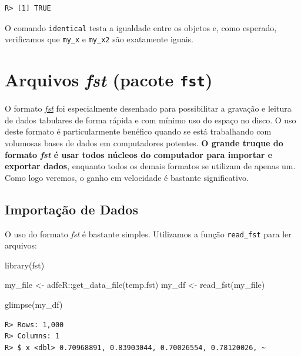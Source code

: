 \documentclass[
  11pt,
]{book}
\newenvironment{Shaded}{\begin{snugshade}}{\end{snugshade}}
\newcommand{\FunctionTok}[1]{\textcolor[rgb]{0,0,0}{#1}}
\newcommand{\NormalTok}[1]{#1}
\newcommand{\OtherTok}[1]{\textcolor[rgb]{0.37,0.37,0.37}{#1}}
\newcommand{\SpecialCharTok}[1]{\textcolor[rgb]{0,0,0}{#1}}
\newcommand{\StringTok}[1]{\textcolor[rgb]{0.5,0.5,0.5}{#1}}
\begin{document}
\begin{verbatim}
R> [1] TRUE
\end{verbatim}

O comando \texttt{identical} testa a igualdade entre os objetos e, como esperado, verificamos que \texttt{my\_x} e \texttt{my\_x2} são exatamente iguais.

\hypertarget{arquivos-fst-pacote-fst}{%
\section{\texorpdfstring{Arquivos \emph{fst} (pacote \texttt{fst})}{Arquivos fst (pacote fst)}}\label{arquivos-fst-pacote-fst}}

O formato \href{http://www.fstpackage.org/}{\emph{fst}} foi especialmente desenhado para possibilitar a gravação e leitura de dados tabulares de forma rápida e com mínimo uso do espaço no disco. O uso deste formato é particularmente benéfico quando se está trabalhando com volumosas bases de dados em computadores potentes. \textbf{O grande truque do formato \emph{fst} é usar todos núcleos do computador para importar e exportar dados}, enquanto todos os demais formatos se utilizam de apenas um. Como logo veremos, o ganho em velocidade é bastante significativo. 

\hypertarget{importauxe7uxe3o-de-dados-3}{%
\subsection{Importação de Dados}\label{importauxe7uxe3o-de-dados-3}}

O uso do formato \emph{fst} é bastante simples. Utilizamos a função \texttt{read\_fst} para ler arquivos:

\begin{Shaded}
\begin{Highlighting}[]
\FunctionTok{library}\NormalTok{(fst)}

\NormalTok{my\_file }\OtherTok{\textless{}{-}}\NormalTok{ adfeR}\SpecialCharTok{::}\FunctionTok{get\_data\_file}\NormalTok{(}\StringTok{\textquotesingle{}temp.fst\textquotesingle{}}\NormalTok{)}
\NormalTok{my\_df }\OtherTok{\textless{}{-}} \FunctionTok{read\_fst}\NormalTok{(my\_file)}

\FunctionTok{glimpse}\NormalTok{(my\_df)}
\end{Highlighting}
\end{Shaded}

\begin{verbatim}
R> Rows: 1,000
R> Columns: 1
R> $ x <dbl> 0.70968891, 0.83903044, 0.70026554, 0.78120026, ~
\end{verbatim}
\end{document}
